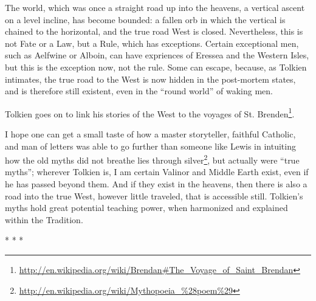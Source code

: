 The world, which was once a straight road up into the heavens, a vertical ascent on a level incline, has become bounded: a fallen orb in which the vertical is chained to the horizontal, and the true road West is closed. Nevertheless, this is not Fate or a Law, but a Rule, which has exceptions. Certain exceptional men, such as Aelfwine or Alboin, can have expriences of Eressea and the Western Isles, but this is the exception now, not the rule. Some can escape, because, as Tolkien intimates, the true road to the West is now hidden in the post-mortem states, and is therefore still existent, even in the ``round world'' of waking men.

Tolkien goes on to link his stories of the West to the voyages of St. Brenden\footnote{\url{http://en.wikipedia.org/wiki/Brendan\#The_Voyage_of_Saint_Brendan}}.

I hope one can get a small taste of how a master storyteller, faithful Catholic, and man of letters was able to go further than someone like Lewis in intuiting how the old myths did not breathe lies through silver\footnote{\url{http://en.wikipedia.org/wiki/Mythopoeia_\%28poem\%29}}, but actually were ``true myths''; wherever Tolkien is, I am certain Valinor and Middle Earth exist, even if he has passed beyond them. And if they exist in the heavens, then there is also a road into the true West, however little traveled, that is accessible still. Tolkien's myths hold great potential teaching power, when harmonized and explained within the Tradition.



\begin{center}* * *\end{center}

